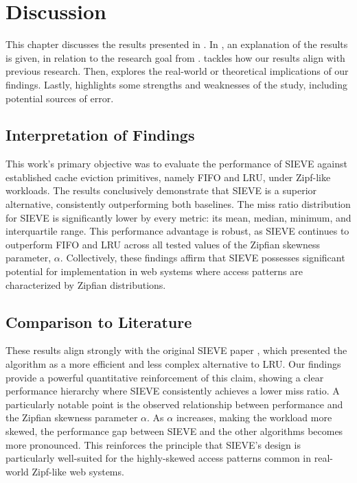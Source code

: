 \chapter{Discussion}\label{chapter:discussion}

This chapter discusses the results presented in . In , an explanation of the results is given, in relation to the research goal from .  tackles how our results align with previous research. Then,  explores the real-world or theoretical implications of our findings. Lastly,  highlights some strengths and weaknesses of the study, including potential sources of error.

\section{Interpretation of Findings}\label{discussion:interpretation}


This work's primary objective was to evaluate the performance of SIEVE against established cache eviction primitives, namely FIFO and LRU, under Zipf-like workloads. The results conclusively demonstrate that SIEVE is a superior alternative, consistently outperforming both baselines. The miss ratio distribution for SIEVE is significantly lower by every metric: its mean, median, minimum, and interquartile range. This performance advantage is robust, as SIEVE continues to outperform FIFO and LRU across all tested values of the Zipfian skewness parameter, $\alpha$. Collectively, these findings affirm that SIEVE possesses significant potential for implementation in web systems where access patterns are characterized by Zipfian distributions.

\section{Comparison to Literature}\label{discussion:literature}


These results align strongly with the original SIEVE paper \cite{sieve}, which presented the algorithm as a more efficient and less complex alternative to LRU. Our findings provide a powerful quantitative reinforcement of this claim, showing a clear performance hierarchy where SIEVE consistently achieves a lower miss ratio. A particularly notable point is the observed relationship between performance and the Zipfian skewness parameter $\alpha$. As $\alpha$ increases, making the workload more skewed, the performance gap between SIEVE and the other algorithms becomes more pronounced. This reinforces the principle that SIEVE's design is particularly well-suited for the highly-skewed access patterns common in real-world Zipf-like web systems.

